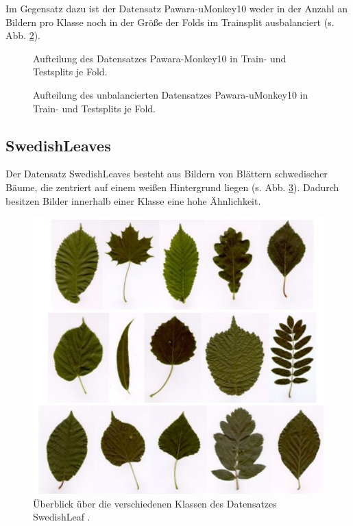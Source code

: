 Im Gegensatz dazu ist der Datensatz Pawara-uMonkey10 weder in der Anzahl an Bildern pro Klasse noch in der Größe der Folds im Trainsplit ausbalanciert (s. Abb. \ref{fig:Pawara-uMonkey10Zusammensetzung}). 


\begin{figure}[H]
\begin{adjustbox}{width=1.2\textwidth, center}

\end{adjustbox}
\caption{Aufteilung des Datensatzes Pawara-Monkey10 \cite{pawaraWebsiteDatensaetze} in Train- und Testsplits je Fold.}
\label{fig:Pawara-Monkey10Zusammensetzung}
\end{figure}
\begin{figure}[H]
\begin{adjustbox}{width=1.2\textwidth, center}

\end{adjustbox}
\caption{Aufteilung des unbalancierten Datensatzes Pawara-uMonkey10 \cite{pawaraWebsiteDatensaetze} in Train- und Testsplits je Fold.}
\label{fig:Pawara-uMonkey10Zusammensetzung}
\end{figure}





\subsection{SwedishLeaves}
\label{ch:methodik_SwedishLeaves}
Der Datensatz SwedishLeaves \cite{swedishLeaves} besteht aus Bildern von Blättern schwedischer Bäume, die zentriert auf einem weißen Hintergrund liegen (s. Abb. \ref{fig:swedishLeavesUeberblick}). Dadurch besitzen Bilder innerhalb einer Klasse eine hohe Ähnlichkeit.

\begin{figure}[H]
\centering
\includegraphics[scale=0.8]{img/2_swedishLeaves-image.jpg}
\caption{Überblick über die verschiedenen Klassen des Datensatzes SwedishLeaf \cite{swedishLeaves}.}
\label{fig:swedishLeavesUeberblick}
\end{figure}

